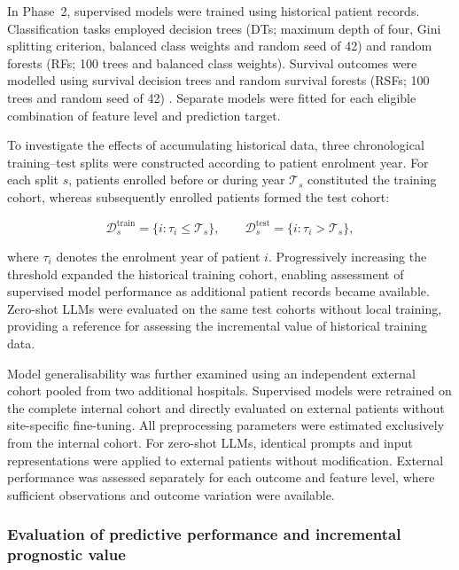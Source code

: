 \documentclass[pdflatex,sn-nature]{sn-jnl}
\begin{document}
In Phase~2, supervised models were trained using historical patient records. Classification tasks employed decision trees (DTs; maximum depth of four, Gini splitting criterion, balanced class weights and random seed of 42) and random forests (RFs; 100 trees and balanced class weights). Survival outcomes were modelled using survival decision trees and random survival forests (RSFs; 100 trees and random seed of 42) \cite{Ishwaran2008}. Separate models were fitted for each eligible combination of feature level and prediction target.

To investigate the effects of accumulating historical data, three chronological training--test splits were constructed according to patient enrolment year. For each split $s$, patients enrolled before or during year $\mathcal{T}_s$ constituted the training cohort, whereas subsequently enrolled patients formed the test cohort:

\begin{equation}
\mathcal{D}_s^{\mathrm{train}}
=
\{i:\tau_i\leq\mathcal{T}_s\},
\qquad
\mathcal{D}_s^{\mathrm{test}}
=
\{i:\tau_i>\mathcal{T}_s\},
\label{eq:splits}
\end{equation}

where $\tau_i$ denotes the enrolment year of patient $i$. Progressively increasing the threshold expanded the historical training cohort, enabling assessment of supervised model performance as additional patient records became available. Zero-shot LLMs were evaluated on the same test cohorts without local training, providing a reference for assessing the incremental value of historical training data.

Model generalisability was further examined using an independent external cohort pooled from two additional hospitals. Supervised models were retrained on the complete internal cohort and directly evaluated on external patients without site-specific fine-tuning. All preprocessing parameters were estimated exclusively from the internal cohort. For zero-shot LLMs, identical prompts and input representations were applied to external patients without modification. External performance was assessed separately for each outcome and feature level, where sufficient observations and outcome variation were available.


\subsubsection{Evaluation of predictive performance and incremental prognostic value}
\label{sec:performance_metrics}
\end{document}
